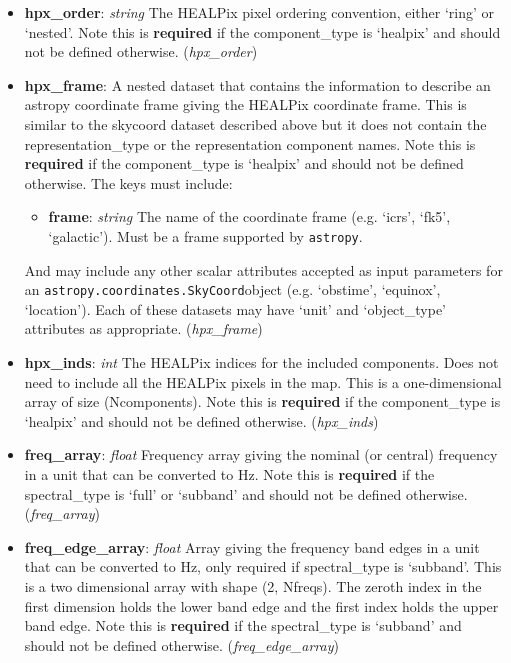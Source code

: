 \documentclass[11pt, oneside]{article}
\begin{document}
\begin{itemize}
\begin{itemize}
\item \textbf{hpx\_order}: \textit{string}
The HEALPix pixel ordering convention, either `ring' or `nested'.
Note this is \textbf{required} if the component\_type is `healpix' and should not be defined otherwise. (\textit{hpx\_order})

\item \textbf{hpx\_frame}:  A nested dataset that contains the information to describe an astropy coordinate frame giving the HEALPix coordinate frame.
This is similar to the skycoord dataset described above but it does not contain the representation\_type or the representation component names.
Note this is \textbf{required} if the component\_type is `healpix' and should not be defined otherwise.
The keys must include:
	\begin{itemize}
	\item \textbf{frame}: \textit{string} The name of the coordinate frame (e.g. `icrs', `fk5', `galactic'). Must be a frame supported by \verb+astropy+.
	\end{itemize}
And may include any other scalar attributes accepted as input parameters for an \verb+astropy.coordinates.SkyCoord+object (e.g. `obstime', `equinox', `location').
Each of these datasets may have `unit' and `object\_type' attributes as appropriate.
(\textit{hpx\_frame})

\item \textbf{hpx\_inds}: \textit{int}
The HEALPix indices for the included components. Does not need to include all the HEALPix pixels in the map.
This is a one-dimensional array of size (Ncomponents).
Note this is \textbf{required} if the component\_type is `healpix' and should not be defined otherwise. (\textit{hpx\_inds})

\item \textbf{freq\_array}: \textit{float}
Frequency array giving the nominal (or central) frequency in a unit that can be converted to Hz.
Note this is \textbf{required} if the spectral\_type is `full' or `subband' and should not be defined otherwise. (\textit{freq\_array})

\item \textbf{freq\_edge\_array}: \textit{float}
Array giving the frequency band edges in a unit that can be converted to Hz, only required if spectral\_type is `subband'.
This is a two dimensional array with shape (2, Nfreqs). The zeroth index in the first dimension holds the lower band edge
and the first index holds the upper band edge.
Note this is \textbf{required} if the spectral\_type is `subband' and should not be defined otherwise. (\textit{freq\_edge\_array})


\end{itemize}
\end{itemize}
\end{document}
